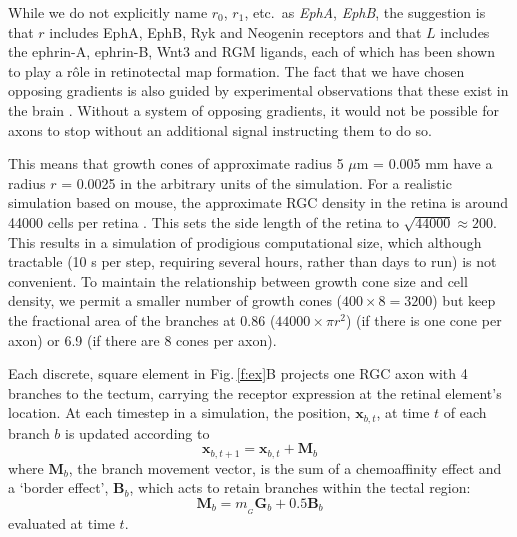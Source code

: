 \documentclass[11pt, a4paper]{article}
\begin{document}
While we do not explicitly name $r_0$, $r_1$,
etc.~as \emph{EphA}, \emph{EphB}, the suggestion is that $r$ includes EphA,
EphB, Ryk \citep{schmitt_wntryk_2006} and
Neogenin \citep{rajagopalan_neogenin_2004} receptors and that $L$ includes the
ephrin-A, ephrin-B, Wnt3 \citep{schmitt_wntryk_2006} and
RGM \citep{monnier_rgm_2002} ligands, each of which has been shown to play a
r\^ole in retinotectal map formation. The fact that we have chosen opposing
gradients is also guided by experimental observations that these exist in the
brain \citep{opposing_gradients}. Without a system of opposing gradients, it
would not be possible for axons to stop without an additional signal
instructing them to do so.


\color{grey}
This means that growth cones of approximate
radius 5 $\mu$m = 0.005 mm \citep{goodhill_can_2016} have a radius $r$ =
0.0025 in the arbitrary units of the simulation. For a realistic simulation
based on mouse, the approximate RGC density in the retina is around 44000
cells per retina \citep{jeon_major_1998}. This sets the side length of the
retina to $\sqrt{44000} \approx 200$. This results in a simulation of
prodigious computational size, which although tractable (10 s per step,
requiring several hours, rather than days to run) is not convenient. To
maintain the relationship between growth cone size and cell density, we permit
a smaller number of growth cones ($400\times8=3200$) but keep the fractional
area of the branches at 0.86 ($44000 \times \pi r^2$) (if there is one cone
per axon) or 6.9 (if there are 8 cones per axon).

\color{black}
Each discrete, square element in Fig.\,\ref{f:ex}B projects one RGC axon with 4
branches to the tectum, carrying the receptor expression at the retinal
element's location.
At each timestep in a simulation, the position, $\mathbf{x}_{b,t}$, at time
$t$ of each branch $b$ is updated according to
%
\begin{equation}
\mathbf{x}_{b,t+1} = \mathbf{x}_{b,t} + \mathbf{M}_{b}
\end{equation}
%
where $\mathbf{M}_{b}$, the branch movement vector, is the sum of a chemoaffinity
effect and a `border effect', $\mathbf{B}_b$, which acts to retain branches
within the tectal region:
%
\begin{equation} \label{e:mv}
\mathbf{M}_{b} = m_{\!_G} \mathbf{G}_b + 0.5 \mathbf{B}_b
\end{equation}
%
evaluated at time $t$.
\end{document}
